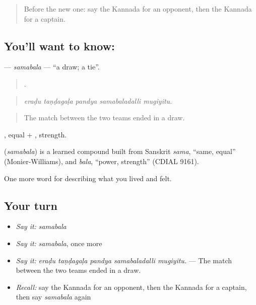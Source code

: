\label{lesson:KA-C539-samabala}



\begin{quote}
Before the new one: say the Kannada for an opponent, then the Kannada for a captain.
\end{quote}

\subsection*{You'll want to know: }
\textbf{} — \emph{samabala} — \textquotedblleft{}a draw; a tie\textquotedblright{}.

\begin{quote}
    .
\end{quote}

\begin{quote}
\emph{eraḍu taṇḍagaḷa pandya samabaladalli mugiyitu.}
\end{quote}

\begin{quote}
The match between the two teams ended in a draw.
\end{quote}

, equal + , strength.

\begin{cousinweb}
\textbf{} (\emph{samabala}) is a learned compound built from Sanskrit \emph{sama}, \textquotedblleft{}same, equal\textquotedblright{} (Monier-Williams), and \emph{bala}, \textquotedblleft{}power, strength\textquotedblright{} (CDIAL 9161).
\end{cousinweb}

\begin{grammarlens}[title={What you've built}]
One more word for describing what you lived and felt.
\end{grammarlens}

\subsection*{Your turn}
\begin{itemize}
\raggedright
  \item \emph{Say it:} \emph{samabala}
  \item \emph{Say it:} \emph{samabala}, once more
  \item \emph{Say it:} \emph{eraḍu taṇḍagaḷa pandya samabaladalli mugiyitu.} — The match between the two teams ended in a draw.
  \item \emph{Recall:} say the Kannada for an opponent, then the Kannada for a captain, then say \emph{samabala} again
\end{itemize}

